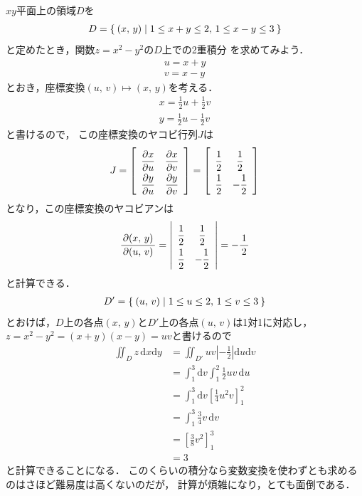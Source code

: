$xy$平面上の領域$D$を
\begin{align*}
D = \Set{ (x, \, y) | 1 \leq  x+y \leq 2 , \, 1 \leq x-y \leq 3 }
\end{align*}
と定めたとき，関数$z=x^2-y^2$の$D$上での2重積分
を求めてみよう．
\begin{align*}
u = x + y \\
v = x - y 
\end{align*}
とおき，座標変換$(u, \, v) \mapsto (x, \, y)$を考える．
\begin{align*}
x = \frac{1}{2} u + \frac{1}{2} v \\
y = \frac{1}{2} u - \frac{1}{2} v
\end{align*}
と書けるので，
この座標変換のヤコビ行列$J$は
\begin{align*}
J = \left[
\renewcommand{\arraystretch}{2}
\begin{array}{cc}
\dfrac{ \partial x}{\partial u} & \dfrac{ \partial x}{\partial v} \\
\dfrac{ \partial y}{\partial u} & \dfrac{ \partial y}{\partial v} \\
\end{array}
\renewcommand{\arraystretch}{1}
\right] = \left[
\renewcommand{\arraystretch}{2}
\begin{array}{cc}
\dfrac{1}{2} & \dfrac{1}{2} \\
\dfrac{1}{2} & - \dfrac{1}{2}
\end{array}
\renewcommand{\arraystretch}{1}
\right]
\end{align*}
となり，この座標変換のヤコビアンは
\begin{align*}
\frac{ \partial ( x , \, y ) }{\partial (u, \, v ) } 
= \left \lvert
\renewcommand{\arraystretch}{2}
\begin{array}{cc}
\dfrac{1}{2} & \dfrac{1}{2} \\
\dfrac{1}{2} & - \dfrac{1}{2}
\end{array}
\renewcommand{\arraystretch}{1}
\right \rvert
= - \frac{1}{2}
\end{align*}
と計算できる．
\begin{align*}
D' = \Set{ (u , \, v) | 1 \leq u \leq 2 , \, 1 \leq v \leq 3 }
\end{align*}
とおけば，$D$上の各点$(x, \, y)$と$D'$上の各点$(u, \, v)$は1対1に対応し，
$z=x^2-y^2=(x+y)(x-y)=uv$と書けるので
\begin{align*}
\iint_D z \, \mathrm{d}x\mathrm{d}y 
& = \iint_{D'} uv \left \lvert - \frac{1}{2} \right \rvert \mathrm{d}u\mathrm{d}v \\
& = \int_1^3 \mathrm{d}v \int_1^2 \frac{1}{2} uv \, \mathrm{d} u \\
& = \int_1^3 \mathrm{d}v \left[ \frac{1}{4} u^2 v \right]_1^2 \\
& = \int_1^3 \frac{3}{4} v \, \mathrm{d}v \\
& = \left[ \frac{3}{8} v^2 \right]_1^3 \\
& = 3
\end{align*}
と計算できることになる．
このくらいの積分なら変数変換を使わずとも求めるのはさほど難易度は高くないのだが，
計算が煩雑になり，とても面倒である．

